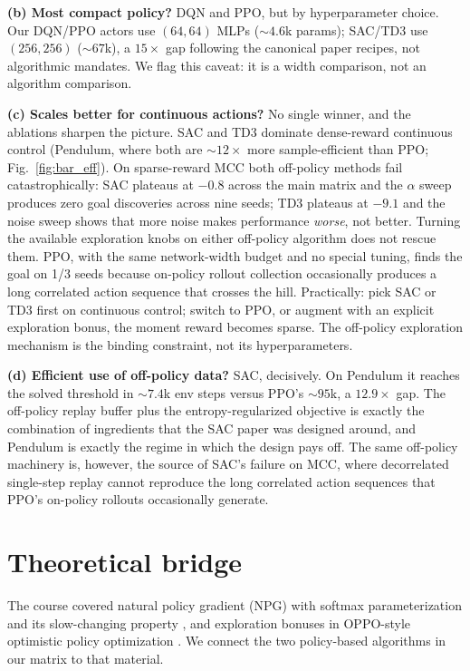 \documentclass[10pt,a4paper]{article}
\begin{document}
\textbf{(b) Most compact policy?} DQN and PPO, but by hyperparameter choice. Our DQN/PPO actors use $(64,64)$ MLPs ($\sim 4.6$k params); SAC/TD3 use $(256,256)$ ($\sim 67$k), a $15\times$ gap following the canonical paper recipes, not algorithmic mandates. We flag this caveat: it is a width comparison, not an algorithm comparison.

\textbf{(c) Scales better for continuous actions?} No single winner, and the ablations sharpen the picture. SAC and TD3 dominate dense-reward continuous control (Pendulum, where both are $\sim 12\times$ more sample-efficient than PPO; Fig.~\ref{fig:bar_eff}). On sparse-reward MCC both off-policy methods fail catastrophically: SAC plateaus at $-0.8$ across the main matrix and the $\alpha$ sweep produces zero goal discoveries across nine seeds; TD3 plateaus at $-9.1$ and the noise sweep shows that more noise makes performance \emph{worse}, not better. Turning the available exploration knobs on either off-policy algorithm does not rescue them. PPO, with the same network-width budget and no special tuning, finds the goal on 1/3 seeds because on-policy rollout collection occasionally produces a long correlated action sequence that crosses the hill. Practically: pick SAC or TD3 first on continuous control; switch to PPO, or augment with an explicit exploration bonus, the moment reward becomes sparse. The off-policy exploration mechanism is the binding constraint, not its hyperparameters.

\textbf{(d) Efficient use of off-policy data?} SAC, decisively. On Pendulum it reaches the solved threshold in $\sim 7.4$k env steps versus PPO's $\sim 95$k, a $12.9\times$ gap. The off-policy replay buffer plus the entropy-regularized objective is exactly the combination of ingredients that the SAC paper was designed around, and Pendulum is exactly the regime in which the design pays off. The same off-policy machinery is, however, the source of SAC's failure on MCC, where decorrelated single-step replay cannot reproduce the long correlated action sequences that PPO's on-policy rollouts occasionally generate.


\section{Theoretical bridge}

The course covered natural policy gradient (NPG) with softmax parameterization and its slow-changing property \cite{agarwal2020theory, mei2020softmax}, and exploration bonuses in OPPO-style optimistic policy optimization \cite{cai2020provably}. We connect the two policy-based algorithms in our matrix to that material.
\end{document}
